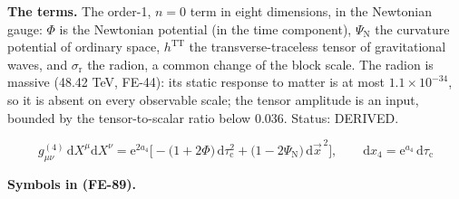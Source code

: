 \documentclass[
  10pt,
]{article}
\begin{document}
\textbf{The terms.} The order-1, \(n = 0\) term in eight dimensions, in
the Newtonian gauge: \(\Phi\) is the Newtonian potential (in the time
component), \(\Psi_{\mathrm{N}}\) the curvature potential of ordinary
space, \(h^{\mathrm{TT}}\) the transverse-traceless tensor of
gravitational waves, and \(\sigma_{\mathrm{r}}\) the radion, a common
change of the block scale. The radion is massive (48.42 TeV, FE-44): its
static response to matter is at most \(1.1\times10^{-34}\), so it is
absent on every observable scale; the tensor amplitude is an input,
bounded by the tensor-to-scalar ratio below 0.036. Status: DERIVED.

\[
g^{(4)}_{\mu\nu}\,\mathrm{d}X^\mu\mathrm{d}X^\nu = \mathrm{e}^{2a_4}\Big[-\big(1 +
 2\Phi\big)\,\mathrm{d}\tau_{\mathrm{c}}^2
 + \big(1 - 2\Psi_{\mathrm{N}}\big)\,\mathrm{d}\vec x^{\,2}\Big],\qquad \mathrm{d}x_4 =
 \mathrm{e}^{a_4}\,\mathrm{d}\tau_{\mathrm{c}} \tag{FE-89}
\]

\textbf{Symbols in (FE-89).}
\end{document}
